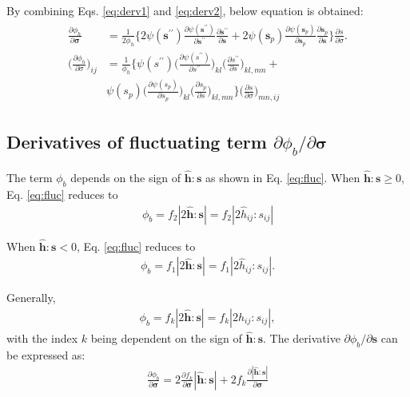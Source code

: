\documentclass[12pt]{amsart}
\begin{document}
By combining Eqs. \ref{eq:derv1} and \ref{eq:derv2}, below equation is obtained:
\begin{eqnarray}
  \label{eq:derv3}
  \begin{split}
  \frac{\partial{\phi_h}}{\partial{\mathbf{\sigma}}} &=\frac{1}{2\phi_h}\bigg\{ 2\psi(\mathbf{s}^{\prime\prime})\frac{\partial{\psi(\mathbf{s}^{\prime\prime})}}{\partial{\mathbf{s}^{\prime\prime}}}  \frac{\partial\mathbf{s}^{\prime\prime}}{\partial \mathbf{s}} + 2\psi(\mathbf{s}_p) \frac{\partial{\psi(\mathbf{s}_p)}}{\partial{\mathbf{s}_p}} \frac{\partial{\mathbf{s}_p}}{\partial{\mathbf{s}}}\bigg\} \frac{\partial{s}}{\partial{\sigma}}.\\
  \Big(\frac{\partial{\phi_h}}{\partial\sigma}\Big)_{ij} &= \frac{1}{\phi_h}\bigg\{ \psi(s^{\prime\prime})\Big(\frac{\partial{\psi(s^{\prime\prime})}}{\partial{s^{\prime\prime}}}\Big)_{kl}  \Big(\frac{\partial s^{\prime\prime}}{\partial s}\Big)_{kl,mn} + \\
    & \psi(s_p) \Big(\frac{\partial{\psi(s_p)}}{\partial{s_p}}\Big)_{kl} \Big(\frac{\partial{s_p}}{\partial s}\Big)_{kl,mn}\bigg\} \Big(\frac{\partial s}{\partial \sigma}\Big)_{mn,ij}
  \end{split}
\end{eqnarray}


\subsection{Derivatives of fluctuating term $\partial\phi_b/\partial\mathbf{\sigma}$}
\label{sec:2.2}



The term $\phi_b$ depends on the sign of $\hat{\mathbf{h}}:\mathbf{s}$ as shown in Eq. \ref{eq:fluc}.
When $\hat{\mathbf{h}}:\mathbf{s}\ge0$, Eq. \ref{eq:fluc} reduces to
\begin{eqnarray}
    \label{eq:fluc1}
\phi_b =f_2|2\hat{\mathbf{h}}:\mathbf{s}|=f_2|2\hat{h}_{ij}:s_{ij}|
\end{eqnarray}


When $\hat{\mathbf{h}}:\mathbf{s}<0$, Eq. \ref{eq:fluc} reduces to
\begin{eqnarray}
    \label{eq:fluc2}
\phi_b  =f_1|2\hat{\mathbf{h}}:\mathbf{s}|=f_1|2\hat{h}_{ij}:s_{ij}|.
\end{eqnarray}

Generally,
\begin{eqnarray}
    \label{eq:fluc3}
\phi_b  =f_k|2\hat{\mathbf{h}}:\mathbf{s}|=f_k|2\hat{h}_{ij}:s_{ij}|,
\end{eqnarray}
with the index $k$ being dependent on the sign of $\hat{\mathbf{h}}:\mathbf{s}$.
The derivative $\partial\phi_b/\partial\mathbf{s}$ can be expressed as:
\begin{eqnarray}
    \label{eq:dphib1}
    \frac{\partial\phi_b}{\partial\mathbf{\sigma}} = 2\frac{\partial f_k}{\partial\mathbf{\sigma}}|\hat{\mathbf{h}}:\mathbf{s}| + 2 f_k \frac{\partial|\hat{\mathbf{h}}:\mathbf{s}|}{\partial\mathbf{\sigma}}
\end{eqnarray}
\end{document}
